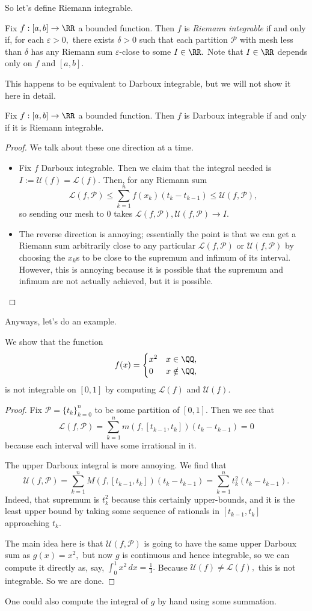\documentclass[../notes.tex]{subfiles}
\begin{document}
So let's define Riemann integrable.
\begin{definition}
	Fix $f:[a,b]\to\RR$ a bounded function. Then $f$ is \textit{Riemann integrable} if and only if, for each $\varepsilon>0,$ there exists $\delta>0$ such that each partition $\mathcal P$ with mesh less than $\delta$ has any Riemann sum $\varepsilon$-close to some $I\in\RR.$ Note that $I\in\RR$ depends only on $f$ and $[a,b].$
\end{definition}
This happens to be equivalent to Darboux integrable, but we will not show it here in detail.
\begin{theorem}
	Fix $f:[a,b]\to\RR$ a bounded function. Then $f$ is Darboux integrable if and only if it is Riemann integrable.
\end{theorem}
\begin{proof}
	We talk about these one direction at a time.
	\begin{itemize}
		\item Fix $f$ Darboux integrable. Then we claim that the integral needed is $I:=\mathcal U(f)=\mathcal L(f).$ Then, for any Riemann sum
		\[\mathcal L(f,\mathcal P)\le\sum_{k=1}^nf(x_k)(t_k-t_{k-1})\le\mathcal U(f,\mathcal P),\]
		so sending our mesh to $0$ takes $\mathcal L(f,\mathcal P),\mathcal U(f,\mathcal P)\to I.$
		\item The reverse direction is annoying; essentially the point is that we can get a Riemann sum arbitrarily close to any particular $\mathcal L(f,\mathcal P)$ or $\mathcal U(f,\mathcal P)$ by choosing the $x_k$s to be close to the supremum and infimum of its interval. However, this is annoying because it is possible that the supremum and infimum are not actually achieved, but it is possible.
		\qedhere
	\end{itemize}
\end{proof}
Anyways, let's do an example.
\begin{exe}
	We show that the function
	\[f(x)=\begin{cases}
		x^2 & x \in \QQ, \\
		0 & x\notin\QQ,
	\end{cases}\]
	is not integrable on $[0,1]$ by computing $\mathcal L(f)$ and $\mathcal U(f).$
\end{exe}
\begin{proof}
	Fix $\mathcal P=\{t_k\}_{k=0}^n$ to be some partition of $[0,1].$ Then we see that
	\[\mathcal L(f,\mathcal P)=\sum_{k=1}^nm(f,[t_{k-1},t_k])(t_k-t_{k-1})=0\]
	because each interval will have some irrational in it.

	The upper Darboux integral is more annoying. We find that
	\[\mathcal U(f,\mathcal P)=\sum_{k=1}^nM(f,[t_{k-1},t_k])(t_k-t_{k-1})=\sum_{k=1}^nt_k^2(t_k-t_{k-1}).\]
	Indeed, that supremum is $t_k^2$ because this certainly upper-bounds, and it is the least upper bound by taking some sequence of rationals in $[t_{k-1},t_k]$ approaching $t_k.$

	The main idea here is that $\mathcal U(f,\mathcal P)$ is going to have the same upper Darboux sum as $g(x)=x^2,$ but now $g$ is continuous and hence integrable, so we can compute it directly as, say, $\int_0^1x^2\,dx=\frac13.$ Because $\mathcal U(f)\ne\mathcal L(f),$ this is not integrable. So we are done.
\end{proof}
\begin{remark}
	One could also compute the integral of $g$ by hand using some summation.
\end{remark}
\end{document}
